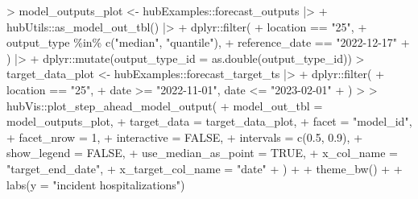 \documentclass[
  letterpaper,
  DIV=11,
  numbers=noendperiod]{scrartcl}
\newenvironment{Shaded}{\begin{snugshade}}{\end{snugshade}}
\newcommand{\AttributeTok}[1]{\textcolor[rgb]{0.40,0.45,0.13}{#1}}
\newcommand{\ConstantTok}[1]{\textcolor[rgb]{0.56,0.35,0.01}{#1}}
\newcommand{\DecValTok}[1]{\textcolor[rgb]{0.68,0.00,0.00}{#1}}
\newcommand{\ErrorTok}[1]{\textcolor[rgb]{0.68,0.00,0.00}{#1}}
\newcommand{\FloatTok}[1]{\textcolor[rgb]{0.68,0.00,0.00}{#1}}
\newcommand{\FunctionTok}[1]{\textcolor[rgb]{0.28,0.35,0.67}{#1}}
\newcommand{\NormalTok}[1]{\textcolor[rgb]{0.00,0.23,0.31}{#1}}
\newcommand{\OtherTok}[1]{\textcolor[rgb]{0.00,0.23,0.31}{#1}}
\newcommand{\SpecialCharTok}[1]{\textcolor[rgb]{0.37,0.37,0.37}{#1}}
\newcommand{\StringTok}[1]{\textcolor[rgb]{0.13,0.47,0.30}{#1}}
\begin{document}
\begin{Shaded}
\begin{Highlighting}[]
\SpecialCharTok{\textgreater{}}\NormalTok{ model\_outputs\_plot }\OtherTok{\textless{}{-}}\NormalTok{ hubExamples}\SpecialCharTok{::}\NormalTok{forecast\_outputs }\SpecialCharTok{|\textgreater{}}
\SpecialCharTok{+}\NormalTok{   hubUtils}\SpecialCharTok{::}\FunctionTok{as\_model\_out\_tbl}\NormalTok{() }\SpecialCharTok{|\textgreater{}}
\SpecialCharTok{+}\NormalTok{   dplyr}\SpecialCharTok{::}\FunctionTok{filter}\NormalTok{(}
\SpecialCharTok{+}\NormalTok{     location }\SpecialCharTok{==} \StringTok{"25"}\NormalTok{,}
\SpecialCharTok{+}\NormalTok{     output\_type }\SpecialCharTok{\%in\%} \FunctionTok{c}\NormalTok{(}\StringTok{"median"}\NormalTok{, }\StringTok{"quantile"}\NormalTok{),}
\SpecialCharTok{+}\NormalTok{     reference\_date }\SpecialCharTok{==} \StringTok{"2022{-}12{-}17"}
\SpecialCharTok{+}\NormalTok{   ) }\SpecialCharTok{|\textgreater{}}
\SpecialCharTok{+}\NormalTok{   dplyr}\SpecialCharTok{::}\FunctionTok{mutate}\NormalTok{(}\AttributeTok{output\_type\_id =} \FunctionTok{as.double}\NormalTok{(output\_type\_id))}
\SpecialCharTok{\textgreater{}}\NormalTok{ target\_data\_plot }\OtherTok{\textless{}{-}}\NormalTok{ hubExamples}\SpecialCharTok{::}\NormalTok{forecast\_target\_ts }\SpecialCharTok{|\textgreater{}}
\SpecialCharTok{+}\NormalTok{   dplyr}\SpecialCharTok{::}\FunctionTok{filter}\NormalTok{(}
\SpecialCharTok{+}\NormalTok{     location }\SpecialCharTok{==} \StringTok{"25"}\NormalTok{,}
\SpecialCharTok{+}\NormalTok{     date }\SpecialCharTok{\textgreater{}=} \StringTok{"2022{-}11{-}01"}\NormalTok{, date }\SpecialCharTok{\textless{}=} \StringTok{"2023{-}02{-}01"}
\SpecialCharTok{+}\NormalTok{   )}
\SpecialCharTok{\textgreater{}} 
\ErrorTok{\textgreater{}}\NormalTok{ hubVis}\SpecialCharTok{::}\FunctionTok{plot\_step\_ahead\_model\_output}\NormalTok{(}
\SpecialCharTok{+}   \AttributeTok{model\_out\_tbl =}\NormalTok{ model\_outputs\_plot,}
\SpecialCharTok{+}   \AttributeTok{target\_data =}\NormalTok{ target\_data\_plot,}
\SpecialCharTok{+}   \AttributeTok{facet =} \StringTok{"model\_id"}\NormalTok{,}
\SpecialCharTok{+}   \AttributeTok{facet\_nrow =} \DecValTok{1}\NormalTok{,}
\SpecialCharTok{+}   \AttributeTok{interactive =} \ConstantTok{FALSE}\NormalTok{,}
\SpecialCharTok{+}   \AttributeTok{intervals =} \FunctionTok{c}\NormalTok{(}\FloatTok{0.5}\NormalTok{, }\FloatTok{0.9}\NormalTok{),}
\SpecialCharTok{+}   \AttributeTok{show\_legend =} \ConstantTok{FALSE}\NormalTok{,}
\SpecialCharTok{+}   \AttributeTok{use\_median\_as\_point =} \ConstantTok{TRUE}\NormalTok{,}
\SpecialCharTok{+}   \AttributeTok{x\_col\_name =} \StringTok{"target\_end\_date"}\NormalTok{, }
\SpecialCharTok{+}   \AttributeTok{x\_target\_col\_name =} \StringTok{"date"}
\SpecialCharTok{+}\NormalTok{ ) }\SpecialCharTok{+}
\SpecialCharTok{+}   \FunctionTok{theme\_bw}\NormalTok{() }\SpecialCharTok{+}
\SpecialCharTok{+}   \FunctionTok{labs}\NormalTok{(}\AttributeTok{y =} \StringTok{"incident hospitalizations"}\NormalTok{)}
\end{Highlighting}
\end{Shaded}
\end{document}
